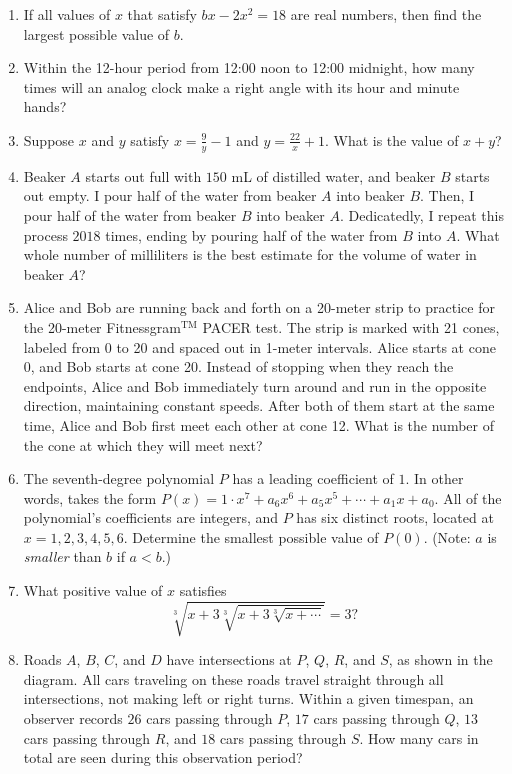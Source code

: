 \documentclass[11pt]{article}
\begin{document}
\begin{enumerate}[1.]
			\item If all values of $x$ that satisfy $bx - 2x^2 = 18$ are real numbers, then find the largest possible value of $b$.
			
			\item Within the 12-hour period from 12:00 noon to 12:00 midnight, how many times will an analog clock make a right angle with its hour and minute hands?
			
			\item Suppose $x$ and $y$ satisfy $x = \frac{9}{y} - 1$ and $y = \frac{22}{x} + 1$. What is the value of $x + y$?
			
			\item Beaker $A$ starts out full with $150$ mL of distilled water, and beaker $B$ starts out empty. I pour half of the water from beaker $A$ into beaker $B$. Then, I pour half of the water from beaker $B$ into beaker $A$. Dedicatedly, I repeat this process $2018$ times, ending by pouring half of the water from $B$ into $A$. What whole number of milliliters is the best estimate for the volume of water in beaker $A$?
			
			\item Alice and Bob are running back and forth on a 20-meter strip to practice for the 20-meter Fitnessgram$^\text{TM}$ PACER test. The strip is marked with 21 cones, labeled from 0 to 20 and spaced out in 1-meter intervals. Alice starts at cone 0, and Bob starts at cone 20. Instead of stopping when they reach the endpoints, Alice and Bob immediately turn around and run in the opposite direction, maintaining constant speeds. After both of them start at the same time, Alice and Bob first meet each other at cone 12. What is the number of the cone at which they will meet next?
			
			\item The seventh-degree polynomial $P$ has a leading coefficient of $1$. In other words,  takes the form $P(x) = 1 \cdot x^7 + a_6 x^6 + a_5 x^5 + \cdots + a_1 x + a_0$. All of the polynomial's coefficients are integers, and $P$ has six distinct roots, located at $x = 1, 2, 3, 4, 5, 6$. Determine the smallest possible value of $P(0)$. (Note: $a$ is \textit{smaller} than $b$ if $a < b$.)
			
			\item What positive value of $x$ satisfies
			$$\sqrt[3]{x + 3\sqrt[3]{x + 3\sqrt[3]{x + \cdots}}} = 3 ?$$
			
			\item Roads $A$, $B$, $C$, and $D$ have intersections at $P$, $Q$, $R$, and $S$, as shown in the diagram. All cars traveling on these roads travel straight through all intersections, not making left or right turns. Within a given timespan, an observer records $26$ cars passing through $P$, $17$ cars passing through $Q$, $13$ cars passing through $R$, and $18$ cars passing through $S$. How many cars in total are seen during this observation period?
		\end{enumerate}
\end{document}
